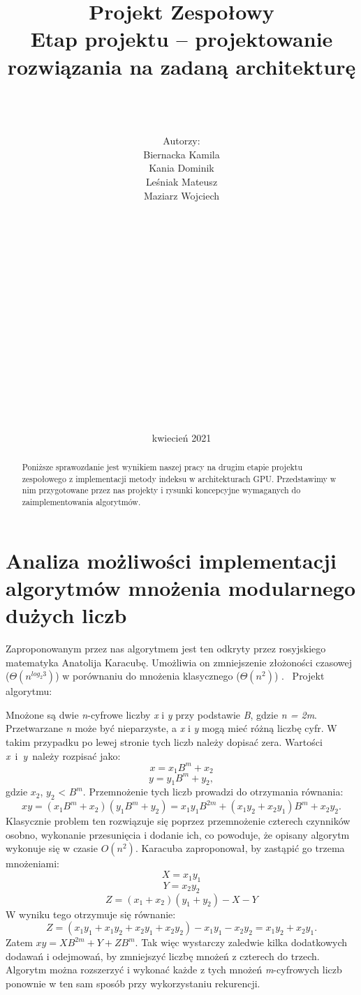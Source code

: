 \documentclass[]{article}
\title{Projekt Zespołowy \\
	\Huge Etap projektu – projektowanie rozwiązania na zadaną architekturę}
\author{\\ \\ \\ Autorzy:
	\\Biernacka Kamila\\ 
	Kania Dominik\\ 
	Leśniak Mateusz\\ 
	Maziarz Wojciech\\ \\ \\ \\ \\ \\ \\ \\ \\ \\ \\ \\ \\ \\ \\ \\ \\  }
\date{kwiecień 2021}
\begin{document}
\maketitle
\newpage

\begin{abstract}

Poniższe sprawozdanie jest wynikiem naszej pracy na drugim etapie projektu zespołowego z implementacji metody indeksu w architekturach GPU. Przedstawimy w nim przygotowane przez nas projekty i rysunki koncepcyjne wymaganych do zaimplementowania algorytmów.



\end{abstract}

\section{Analiza możliwości implementacji algorytmów mnożenia modularnego dużych liczb}
Zaproponowanym przez nas algorytmem jest ten odkryty przez rosyjskiego matematyka Anatolija Karacubę. Umożliwia on zmniejszenie złożoności czasowej ($\Theta(n^{log_{2}3})$) w porównaniu do mnożenia klasycznego ($\Theta(n^2)$) .
\newline\newline
~Projekt algorytmu:\newline

Mnożone są dwie \textit{n}-cyfrowe liczby \textit{x} i \textit{y} przy podstawie \textit{B}, gdzie \textit{n = 2m}. Przetwarzane \textit{n} może być nieparzyste, a \textit{x} i \textit{y} mogą mieć różną liczbę cyfr. W takim przypadku po lewej stronie tych liczb należy dopisać zera. Wartości \textit{x}~i~\textit{y}~należy rozpisać jako:\newline
$$ x = x_{1}B^{m} + x_2 $$
$$ y = y_{1}B^{m} + y_2, $$
gdzie $x_2$, $y_2$ < $B^m$. \newline
Przemnożenie tych liczb prowadzi do otrzymania równania:
$$xy = (x_{1}B^{m} + x_2)(y_1B^m + y_2) = x_1y_1B^{2m} + (x_1y_2 + x_2y_1)B^m + x_2y_2.$$ 
Klasycznie problem ten rozwiązuje się poprzez przemnożenie czterech czynników osobno, wykonanie przesunięcia i dodanie ich, co powoduje, że opisany algorytm wykonuje się w czasie $\textit{O}(n^{2})$. Karacuba zaproponował, by zastąpić go trzema mnożeniami:
$$X = x_1y_1$$
$$Y = x_2y_2$$
$$Z = (x_1 + x_2)(y_1 + y_2) - X - Y$$
W wyniku tego otrzymuje się równanie:
$$ Z = (x_1y_1 + x_1y_2 + x_2y_1 + x_2y_2) - x_1y_1 - x_2y_2 = x_1y_2 + x_2y_1.$$
Zatem $xy = XB^{2m} + Y + ZB^m$. Tak więc wystarczy zaledwie kilka dodatkowych dodawań i odejmowań, by zmniejszyć liczbę mnożeń z czterech do trzech.\newline
Algorytm można rozszerzyć i wykonać każde z tych mnożeń \textit{m}-cyfrowych liczb ponownie w ten sam sposób przy wykorzystaniu rekurencji.
\end{document}
